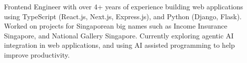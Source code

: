 

\begin{cvparagraph}

Frontend Engineer with over 4+ years of experience building web applications using TypeScript (React.js, Next.js, Express.js), and Python (Django, Flask). Worked on projects for Singaporean big names such as Income Insurance Singapore, and National Gallery Singapore. Currently exploring agentic AI integration in web applications, and using AI assisted programming to help improve productivity.

\end{cvparagraph}
